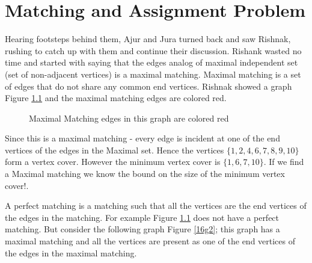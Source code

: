 \chapter{Matching and Assignment Problem}

Hearing footsteps behind them, Ajur and Jura turned back and saw Rishnak, rushing to catch up with them and continue their discussion. Rishank wasted no time and started with saying that the edges analog of maximal independent set (set of non-adjacent vertices) is a maximal matching. Maximal matching is a set of edges that do not share any common end vertices. Rishnak showed a graph Figure \ref{16g1} and the maximal matching edges are colored red.
\begin{figure}
\begin{center}

\caption{Maximal Matching edges in this graph are colored red}\label{16g1}
\end{center}
\end{figure}

Since this is a maximal matching - every edge is incident at one of the end vertices of the edges in the Maximal set. Hence the vertices $\{1,2,4,6,7,8,9,10\}$ form a vertex cover. However the minimum vertex cover is $\{1,6,7,10\}$. If we find a Maximal matching we know the bound on the size of the minimum vertex cover!.


A perfect matching is a matching such that all the vertices are the end vertices of the edges in the matching. For example Figure \ref{16g1} does not have a perfect matching.  But consider the following graph Figure \ref{16g2}; this graph has a maximal matching and all the vertices are present as one of the end vertices of the edges in the maximal matching.

